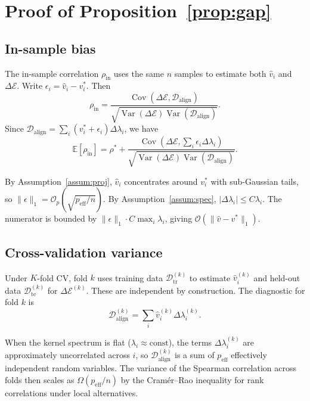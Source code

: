 \documentclass[twoside,11pt]{article}
\begin{document}



\newpage
\appendix
\setcounter{figure}{0}
\setcounter{table}{0}
\renewcommand{\thefigure}{S\arabic{figure}}
\renewcommand{\thetable}{S\arabic{table}}

\section{Proof of Proposition~\ref{prop:gap}}
\label{app:proof}

\subsection{In-sample bias}

The in-sample correlation $\rho_{\text{in}}$ uses the same $n$ samples to estimate both $\hat{v}_i$ and $\Delta\mathcal{E}$. Write $\epsilon_i = \hat{v}_i - v_i^*$. Then
\[
\rho_{\text{in}} = \frac{\operatorname{Cov}(\Delta\mathcal{E}, \mathcal{D}_{\text{align}})}{\sqrt{\operatorname{Var}(\Delta\mathcal{E})\operatorname{Var}(\mathcal{D}_{\text{align}})}}.
\]
Since $\mathcal{D}_{\text{align}} = \sum_i (v_i^* + \epsilon_i)\Delta\lambda_i$, we have
\[
\mathbb{E}[\rho_{\text{in}}] = \rho^* + \frac{\operatorname{Cov}(\Delta\mathcal{E}, \sum_i \epsilon_i \Delta\lambda_i)}{\sqrt{\operatorname{Var}(\Delta\mathcal{E})\operatorname{Var}(\mathcal{D}_{\text{align}})}}.
\]

By Assumption~\ref{assum:proj}, $\hat{v}_i$ concentrates around $v_i^*$ with sub-Gaussian tails, so $\|\epsilon\|_1 = \mathcal{O}_p(\sqrt{p_{\text{eff}}/n})$. By Assumption~\ref{assum:spec}, $|\Delta\lambda_i| \leq C\lambda_i$. The numerator is bounded by $\|\epsilon\|_1 \cdot C\max_i\lambda_i$, giving $\mathcal{O}(\|\hat{v} - v^*\|_1)$.

\subsection{Cross-validation variance}

Under $K$-fold CV, fold $k$ uses training data $\mathcal{D}_{\text{tr}}^{(k)}$ to estimate $\hat{v}_i^{(k)}$ and held-out data $\mathcal{D}_{\text{te}}^{(k)}$ for $\Delta\mathcal{E}^{(k)}$. These are independent by construction. The diagnostic for fold $k$ is
\[
\mathcal{D}_{\text{align}}^{(k)} = \sum_i \hat{v}_i^{(k)} \Delta\lambda_i^{(k)}.
\]

When the kernel spectrum is flat ($\lambda_i \approx \text{const}$), the terms $\Delta\lambda_i^{(k)}$ are approximately uncorrelated across $i$, so $\mathcal{D}_{\text{align}}^{(k)}$ is a sum of $p_{\text{eff}}$ effectively independent random variables. The variance of the Spearman correlation across folds then scales as $\Omega(p_{\text{eff}}/n)$ by the Cram\'er--Rao inequality for rank correlations under local alternatives.
\end{document}
